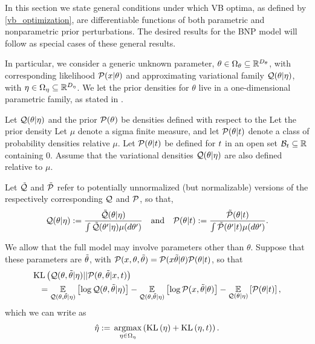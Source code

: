 In this section we state general conditions under which VB optima, as defined by
\eqref{vb_optimization}, are differentiable functions of both parametric and
nonparametric prior perturbations.  The desired results for the BNP model will
follow as special cases of these general results.

In particular, we consider a generic unknown parameter, $\theta \in \Omega_{\theta}
\subseteq \mathbb{R}^{{D_{\theta}}}$, with corresponding likelihood $\mathcal{P}(x \vert
\theta)$ and approximating variational family $\mathcal{Q}(\theta \vert \eta)$, with
$\eta \in \Omega_{\eta} \subseteq \mathbb{R}^{D_{\eta}}$.  We let the prior densities for
$\theta$ live in a one-dimensional parametric family, as stated in
.

\begin{defn}
%
Let $\mathcal{Q}(\theta \vert \eta)$ and the prior $\mathcal{P}(\theta)$ be densities defined with
respect to the  Let the prior density Let $\mu$ denote a sigma finite measure,
and let $\mathcal{P}(\theta \vert t)$ denote a class of probability densities relative
$\mu$.  Let $\mathcal{P}(\theta \vert t)$ be defined for $t$ in an open set $\mathcal{B}_t
\subseteq \mathbb{R}$ containing $0$. Assume that the variational densities
$\mathcal{Q}(\theta \vert \eta)$ are also defined relative to $\mu$.

Let $\tilde{\mathcal{Q}}$ and $\tilde{\mathcal{P}}$ refer to potentially
unnormalized (but normalizable) versions of the respectively corresponding $\mathcal{Q}$
and $\mathcal{P}$, so that,
%
\begin{align*}
%
\q(\theta \vert \eta) :={}
    \frac{\qtil(\theta \vert \eta)}
    {\int \qtil(\theta' \vert \eta) \mu(d\theta')} \mathand
\p(\theta \vert \t) :={}
    \frac{\ptil(\theta \vert \t)}
    {\int \ptil(\theta' \vert \t) \mu(d\theta')}.
%
\end{align*}
%
\end{defn}

We allow that the full model may involve parameters other than $\theta$. Suppose
that these parameters are $\tilde{\theta}$, with $\mathcal{P}(x, \theta, \tilde{\theta}) = \mathcal{P}(x
\tilde{\theta} \vert \theta) \mathcal{P}(\theta \vert t)$,
so that
%
\begin{align*}
%
\MoveEqLeft
\KL{\q(\theta, \thetatil \vert \eta) || \p(\theta, \thetatil \vert \x, \t)}\\
    ={}& \expect{\q(\theta, \thetatil \vert \eta)}
                {\log \q(\theta, \thetatil \vert \eta)} -
        \expect{\q(\theta, \thetatil \vert \eta)}
               {\log \p(\x, \thetatil \vert \theta)} -
       \expect{\q(\theta \vert \eta)}
              {\p(\theta \vert \t)},
%
\end{align*}
%
which we can write as
%
\begin{align*}
%
\etaopt :={} \argmax_{\eta \in \etadom} \left( \KL{\eta} + \KL{\eta, \t}\right).
%
\end{align*}
%



